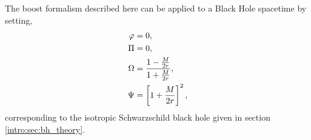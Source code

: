 The boost formalism described here can be applied to a Black Hole spacetime by setting,
\begin{align}
\varphi&=0,\\
\Pi&=0,\\
\Omega &= \frac{1-\frac{M}{2r}}{1+\frac{M}{2r}}, \\
 \Psi &= \left[1+\frac{M}{2r}\right]^2,
 \end{align}
 corresponding to the isotropic Schwarzschild black hole given in section \ref{intro:sec:bh_theory}.



